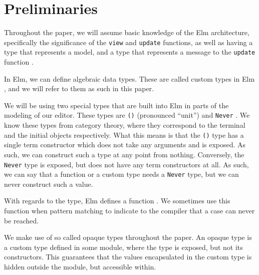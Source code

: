 \section{Preliminaries}
\label{preliminaries}

Throughout the paper, we will assume basic knowledge of the Elm architecture,
specifically the significance of the \texttt{view} and \texttt{update}
functions, as well as having a type that represents a model, and a type that
represents a message to the \texttt{update}
function \cite{Elm-lang-architecture}.

In Elm, we can define algebraic data types. These are called custom types in
Elm \cite{Elm-lang-custom-types}, and we will refer to them as such in this
paper.

We will be using two special types that are built into Elm in parts of the
modeling of our editor. These types are \texttt{()} (pronounced ``unit'') and
\texttt{Never} \elmcore. We know these types from category theory, where they
correspond to the terminal and the initial objects respectively. What this means
is that the \texttt{()} type has a single term constructor which does not take
any arguments and is exposed. As such, we can construct such a type at any point
from nothing. Conversely, the \texttt{Never} type is exposed, but does not have
any term constructors at all. As such, we can say that a function or a custom
type needs a \texttt{Never} type, but we can never construct such a value.

With regards to the  type, Elm defines a function  \elmcore. We sometimes use this function when pattern matching to indicate to the
compiler that a case can never be reached.

We make use of so called opaque types throughout the paper. An opaque type is a
custom type defined in some module, where the type is exposed, but not its
constructors. This guarantees that the values encapsulated in the custom type is
hidden outside the module, but accessible within.
